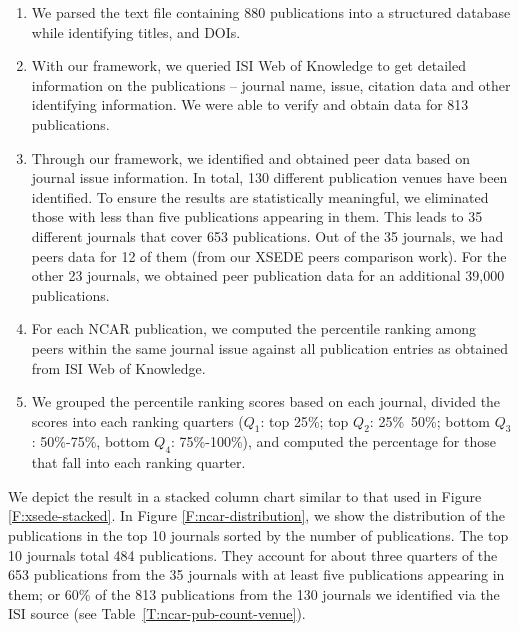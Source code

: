 \documentclass{sig-alternate}
\begin{document}
\begin{enumerate}

\item We parsed the text file containing 880 publications into a structured database while identifying titles, and DOIs.

\item With our framework, we queried ISI Web of Knowledge to get detailed information on the publications -- journal name, issue, citation data and other identifying information. We were able to verify and obtain data for 813 publications.

\item Through our framework, we identified and obtained peer data based on journal issue information. In total, 130 different publication venues have been identified. To ensure the results are statistically meaningful, we eliminated those with less than five publications appearing in them.  This leads to 35 different journals that cover 653 publications. Out of the 35 journals, we had peers data for 12 of them (from our XSEDE peers comparison work). For the other 23 journals, we obtained peer publication data for an additional 39,000 publications.

\item For each NCAR publication, we computed the percentile ranking among peers within the same journal issue against all publication entries as obtained from ISI Web of Knowledge.

\item We grouped the percentile ranking scores based on each journal, divided the scores into each ranking quarters ($Q_1$: top 25\%; top $Q_2$: 25\%~50\%; bottom $Q_3$: 50\%-75\%, bottom $Q_4$: 75\%-100\%), and computed the percentage for those that fall into each ranking quarter.

\end{enumerate}

We depict the result in a stacked column chart similar to that used in Figure \ref{F:xsede-stacked}.  In Figure \ref{F:ncar-distribution}, we show the distribution of the publications in the top 10 journals sorted by the number of publications. The top 10 journals total 484 publications. They account for about three quarters of the 653 publications from the 35 journals with at least five publications appearing in them; or 60\% of the 813 publications from the 130 journals we identified via the ISI source (see Table~\ref{T:ncar-pub-count-venue}).
\end{document}
